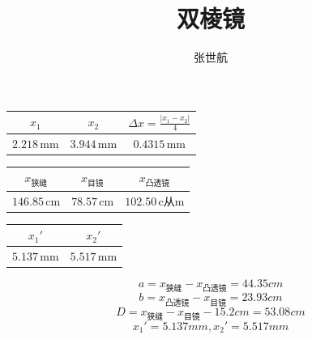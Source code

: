 \documentclass[10pt, a4paper]{article}
\author{张世航}
\title{双棱镜}
\begin{document}
	\maketitle
	\begin{table}[h]
		\centering %
		\begin{tabular}{|c|c|c|}
			\hline
			\(x_1\) & \(x_2\) & \(\Delta x = \frac{|x_1 - x_2|}{4}\) \\
			\hline
			\(2.218\,\mathrm{mm}\) & \(3.944\,\mathrm{mm}\) & \(0.4315\,\mathrm{mm}\)  \\
			\hline
		\end{tabular}
	\end{table}
    
    
    \begin{table}[h]
    	\centering %
    	\begin{tabular}{|c|c|c|}
    		\hline
    		\(x_{\text{狭缝}}\) & \(x_{\text{目镜}}\) & $x_{\text{凸透镜}}$ \\
    		\hline
    		\(146.85\,\mathrm{cm}\) & \(78.57\,\mathrm{cm}\) & \(102.50\,\mathrm{c从m}\)  \\
    		\hline
    	\end{tabular}
    \end{table}
    
    \begin{table}[h]
    	\centering %
    	\begin{tabular}{|c|c|}
    		\hline
    		\(x_1'\) & \(x_2'\)  \\
    		\hline
    		\(5.137\,\mathrm{mm}\) & \(5.517\,\mathrm{mm}\) \\
    		\hline
    	\end{tabular}
    \end{table}
    
    \[a = x_{\text{狭缝}} - x_{\text{凸透镜}} = 44.35cm\]
    \[b = x_{\text{凸透镜}} - x_{\text{目镜}} = 23.93cm\]    
    \[D = x_{\text{狭缝}} - x_{\text{目镜}} - 15.2cm= 53.08cm\]
    \[x_1' = 5.137mm , x_2' = 5.517mm\]
    
\end{document}
